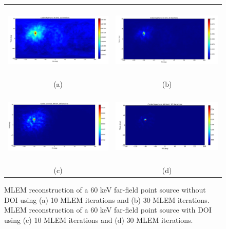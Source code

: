 \documentclass[10pt]{article}
\begin{document}
\begin{figure}[htb!]
\hypertarget{fig4}{}
\centering
\begin{tabular}{cc}
	\includegraphics[height=100pt]{Figures/MLEM_60_noDOI_HP912_10itr.png} & 
	\includegraphics[height=100pt]{Figures/MLEM_60_noDOI_HP912_30itr.png} \\ [-0.5ex]
	\scriptsize{(a)} & \scriptsize{(b)} \\ [1ex]
	\includegraphics[height=100pt]{Figures/MLEM_60_DOI_HP912_10itr.png} & 
	\includegraphics[height=100pt]{Figures/MLEM_60_DOI_HP912_30itr.png} \\ [-0.5ex]
	\scriptsize{(c)} & \scriptsize{(d)} \\[-5pt]
\end{tabular}
\caption{MLEM reconstruction of a 60 keV far-field point source without DOI using (a) 10 MLEM iterations and (b) 30 MLEM iterations. MLEM reconstruction of a 60 keV far-field point source with DOI using (c) 10 MLEM iterations and (d) 30 MLEM iterations. }
\end{figure}
\end{document}
